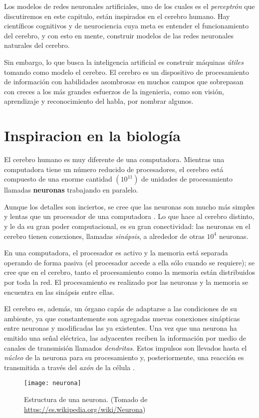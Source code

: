 Los modelos de redes neuronales artificiales, uno de los cuales es el
\textit{perceptrón} que discutiremos en este capitulo, están
inspirados en el cerebro humano. Hay científicos cognitivos y de
neurociencia cuya meta es entender el funcionamiento del cerebro, y
con esto en mente, construir modelos de las redes neuronales naturales
del cerebro.

Sin embargo, lo que busca la inteligencia artificial es construir
máquinas \textit{útiles} tomando como modelo el cerebro. El cerebro es
un dispositivo de procesamiento de información con habilidades
asombrosas en muchos campos que sobrepasan con creces a los más
grandes esfuerzos de la ingenieria, como son visión, aprendizaje y
reconocimiento del habla, por nombrar algunos.

\section{Inspiracion en la biología}
El cerebro humano es muy diferente de una computadora. Mientras una
computadora tiene un número reducido de procesadores, el cerebro está
compuesto de una enorme cantidad $(10^{11})$ de unidades de
procesamiento llamadas \textbf{neuronas} trabajando en paralelo.

Aunque los detalles son inciertos, se cree que las neuronas son mucho
más simples y lentas que un procesador de una computadora
\cite{ethem}. Lo que hace al cerebro distinto, y le da su gran poder
computacional, es su gran conectividad: las neuronas en el cerebro
tienen conexiones, llamadas \textit{sinápsis}, a alrededor de otras
$10^{4}$ neuronas.

En una computadora, el procesador es activo y la memoria está separada
operando de forma pasiva (el procesador accede a ella sólo cuando se
requiere); se cree que en el cerebro, tanto el procesamiento como la
memoria están distribuidos por toda la red. El procesamiento es
realizado por las neuronas y la memoria se encuentra en las sinápsis
entre ellas.

El cerebro es, además, un órgano capás de adaptarse a las condiciones
de su ambiente, ya que constantemente son agregadas nuevas conexiones
sinápticas entre neuronas y modificadas las ya existentes. Una vez que
una neurona ha emitido una señal eléctrica, las adyacentes reciben la
información por medio de canales de transmisión llamados
\textit{dendritas}. Estos impulsos son llevados hasta el
\textit{núcleo} de la neurona para su procesamiento y, posteriormente,
una reacción es transmitida a través del \textit{axón} de la célula
\cite{memes}.
\begin{figure}[h]
  \texttt{[image: neurona]} \centering
  \caption{Estructura de una neurona. (Tomado de
    \url{https://es.wikipedia.org/wiki/Neurona})}
\end{figure}

